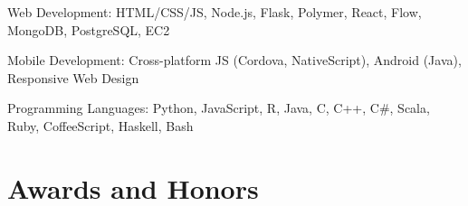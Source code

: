 \documentclass[margin,line]{resume}
\begin{document}
\begin{resume}
Web Development: HTML/CSS/JS, Node.js, Flask, Polymer, React, Flow, MongoDB, PostgreSQL, EC2 %








\vspace{-4mm}

Mobile Development: Cross-platform JS (Cordova, NativeScript), Android (Java), Responsive Web Design

\vspace{-4mm}

Programming Languages: Python, JavaScript, R, Java, C, C++, C\#, Scala, Ruby, CoffeeScript, Haskell, Bash




\section{\mysidestyle Awards and Honors}


\end{resume}
\end{document}
